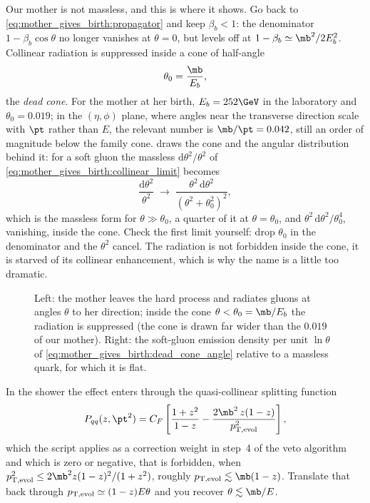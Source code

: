 Our mother is not massless, and this is where it shows. Go back to
\cref{eq:mother_gives_birth:propagator} and keep $\beta_b<1$: the
denominator $1-\beta_b\cos\theta$ no longer vanishes at $\theta=0$, but
levels off at $1-\beta_b\simeq\mb^2/2E_b^2$. Collinear radiation is
suppressed inside a cone of half-angle
\begin{equation}
  \theta_0=\frac{\mb}{E_b},
  \label{eq:mother_gives_birth:theta0}
\end{equation}
the \emph{dead cone}. For the mother at her birth, $E_b=252\GeV$ in the
laboratory and $\theta_0=0.019$; in the $(\eta,\phi)$ plane, where angles
near the transverse direction scale with $\pt$ rather than $E$, the relevant
number is $\mb/\pt=0.042$, still an order of magnitude below the family
cone.  draws the cone and the
angular distribution behind it: for a soft gluon the massless
$\mathrm{d}\theta^2/\theta^2$ of \cref{eq:mother_gives_birth:collinear_limit}
becomes
\begin{equation}
  \frac{\mathrm{d}\theta^2}{\theta^2}\;\longrightarrow\;
  \frac{\theta^2\,\mathrm{d}\theta^2}{(\theta^2+\theta_0^2)^2},
  \label{eq:mother_gives_birth:dead_cone_angle}
\end{equation}
which is the massless form for $\theta\gg\theta_0$, a quarter of it at
$\theta=\theta_0$, and $\theta^2\,\mathrm{d}\theta^2/\theta_0^4$, vanishing,
inside the cone. Check the first limit yourself: drop $\theta_0$ in the
denominator and the $\theta^2$ cancel. The radiation is not forbidden
inside the cone, it is starved of its collinear enhancement, which is why
the name is a little too dramatic.

\begin{figure}[htbp]\centering
\resizebox{\textwidth}{!}{}
\caption[The dead cone]{Left: the mother leaves the hard process and
radiates gluons at angles $\theta$ to her direction; inside the cone
$\theta<\theta_0=\mb/E_b$ the radiation is suppressed (the cone is drawn far
wider than the $0.019$ of our mother). Right: the soft-gluon emission
density per unit $\ln\theta$ of \cref{eq:mother_gives_birth:dead_cone_angle}
relative to a massless quark, for which it is flat.}
\label{fig:mother_gives_birth:dead_cone}
\end{figure}

In the shower the effect enters through the quasi-collinear splitting
function
\begin{equation}
  P_{qq}(z,\pt^2)=C_F\left[\frac{1+z^2}{1-z}
  -\frac{2\mb^2\,z(1-z)}{\ptevol^2}\right],
  \label{eq:mother_gives_birth:dead_cone_kernel}
\end{equation}
which the script applies as a correction weight in step~4 of the veto
algorithm and which is zero or negative, that is forbidden, when
$\ptevol^2\le2\mb^2z(1-z)^2/(1+z^2)$, roughly
$\ptevol\lesssim\mb(1-z)$. Translate that back through
$p_{\mathrm{T,evol}}\simeq(1-z)E\theta$ and you recover
$\theta\lesssim\mb/E$.

